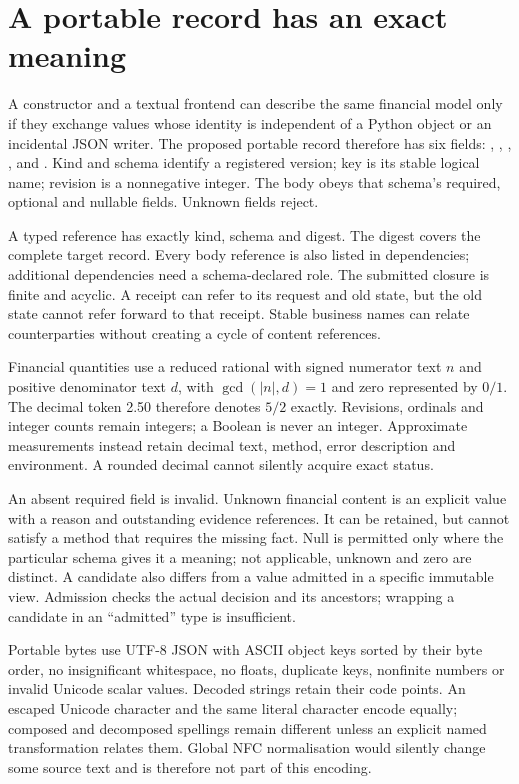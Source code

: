 \section{A portable record has an exact meaning}
\label{sec:portable-record}

A constructor and a textual frontend can describe the same financial model
only if they exchange values whose identity is independent of a Python object
or an incidental JSON writer. The proposed portable record therefore has six
fields: , , , ,  and
. Kind and schema identify a registered version; key is its
stable logical name; revision is a nonnegative integer. The body obeys that
schema's required, optional and nullable fields. Unknown fields reject.

A typed reference has exactly kind, schema and digest. The digest covers the
complete target record. Every body reference is also listed in dependencies;
additional dependencies need a schema-declared role. The submitted closure is
finite and acyclic. A receipt can refer to its request and old state, but the
old state cannot refer forward to that receipt. Stable business names can
relate counterparties without creating a cycle of content references.

Financial quantities use a reduced rational with signed numerator text $n$ and
positive denominator text $d$, with $\gcd(|n|,d)=1$ and zero represented by
$0/1$. The decimal token 2.50 therefore denotes $5/2$ exactly. Revisions,
ordinals and integer counts remain integers; a Boolean is never an integer.
Approximate measurements instead retain decimal text, method, error description
and environment. A rounded decimal cannot silently acquire exact status.

An absent required field is invalid. Unknown financial content is an explicit
value with a reason and outstanding evidence references. It can be retained,
but cannot satisfy a method that requires the missing fact. Null is permitted
only where the particular schema gives it a meaning; not applicable, unknown
and zero are distinct. A candidate also differs from a value admitted in a
specific immutable view. Admission checks the actual decision and its ancestors;
wrapping a candidate in an ``admitted'' type is insufficient.

Portable bytes use UTF-8 JSON with ASCII object keys sorted by their byte order,
no insignificant whitespace, no floats, duplicate keys, nonfinite numbers or
invalid Unicode scalar values. Decoded strings retain their code points.
An escaped Unicode character and the same literal character encode equally;
composed and decomposed spellings remain different unless an explicit named
transformation relates them. Global NFC normalisation would silently change
some source text and is therefore not part of this encoding.

